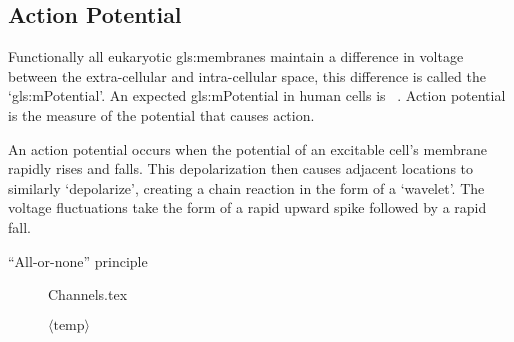 \documentclass[../../Orator]{subfiles}
\begin{document}
\endgroup

\subsection{Action Potential}

Functionally all eukaryotic \glspl{gls:membrane} maintain a difference in voltage between the extra-cellular and intra-cellular space, this difference is called the `\gls{gls:mPotential}'. An expected \gls{gls:mPotential} in human cells is ~\cite{}.
Action potential is the measure of the potential that causes action.

An action potential occurs when the potential of an excitable cell's membrane rapidly rises and falls. This depolarization then causes adjacent locations to similarly `depolarize', creating a chain reaction in the form of a `wavelet'.
The voltage fluctuations take the form of a rapid upward spike followed by a rapid fall.

``All-or-none'' principle

\begin{figure}[ht]
    \centering
    {Channels.tex}
    \caption{ $\langle \text{temp} \rangle$ }\label{fig:Channels}
\end{figure}
\end{document}
